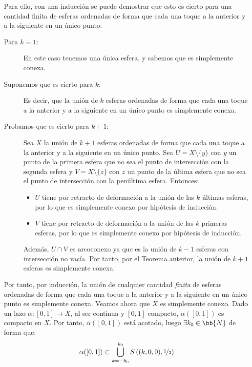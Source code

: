 \begin{ejemplo}
\begin{enumerate}
        Para ello, con una inducción se puede demostrar que esto es cierto para una cantidad finita de esferas ordenadas de forma que cada una toque a la anterior y a la siguiente en un único punto.
        \begin{description}
            \item[Para $k=1$:] En este caso tenemos una única esfera, y sabemos que es simplemente conexa.
            \item[Suponemos que es cierto para $k$:] Es decir, que la unión de $k$ esferas ordenadas de forma que cada una toque a la anterior y a la siguiente en un único punto es simplemente conexa.
            \item[Probamos que es cierto para $k+1$:] Sea $X$ la unión de $k+1$ esferas ordenadas de forma que cada una toque a la anterior y a la siguiente en un único punto. Sea $U=X\setminus \{y\}$ con $y$ un punto de la primera esfera que no sea el punto de intersección con la segunda esfera y $V=X\setminus \{z\}$ con $z$ un punto de la última esfera que no sea el punto de intersección con la penúltima esfera. Entonces:
            \begin{itemize}
                \item $U$ tiene por retracto de deformación a la unión de las $k$ últimas esferas, por lo que es simplemente conexo por hipótesis de inducción. 
                \item $V$ tiene por retracto de deformación a la unión de las $k$ primeras esferas, por lo que es simplemente conexo por hipótesis de inducción.
            \end{itemize}

            Además, $U\cap V$ es arcoconexo ya que es la unión de $k-1$ esferas con intersección no vacía. Por tanto, por el Teorema anterior, la unión de $k+1$ esferas es simplemente conexa.
        \end{description}

        Por tanto, por inducción, la unión de cualquier cantidad \emph{finita} de esferas ordenadas de forma que cada una toque a la anterior y a la siguiente en un único punto es simplemente conexa. Veamos ahora que $X$ es simplemente conexo. Dado un lazo $\alpha:[0,1]\to X$, al ser continua y $[0,1]$ compacto, $\alpha([0,1])$ es compacto en $X$. Por tanto, $\alpha([0,1])$ está acotado, luego $\exists k_0\in \bb{N}$ de forma que:
        \begin{equation*}
            \alpha([0,1]) \subset \bigcup\limits_{k=-k_0}^{k_0} S\left((k,0,0), \nicefrac{1}{2}\right)
        \end{equation*}


\end{enumerate}
\end{ejemplo}
